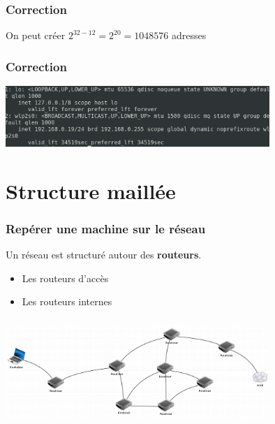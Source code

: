\documentclass[svgnames,11pt]{beamer}
\begin{document}
\begin{frame}
    \frametitle{Correction}

    On peut créer $2^{32-12}=2^{20} = 1048576$ adresses

\end{frame}
\begin{frame}
    \frametitle{Correction}

    \begin{center}
        \centering
        \includegraphics[width=10cm]{ressources/ip.png}
        \label{IMG}
    \end{center}

\end{frame}
\section{Structure maillée}
\begin{frame}
    \frametitle{Repérer une machine sur le réseau}

    Un réseau est structuré autour des \textbf{routeurs}.
\begin{itemize}
    \item<1-> Les routeurs d'accès
    \item<2-> Les routeurs internes
\end{itemize}

\end{frame}

\begin{frame}
    \frametitle{}

    \begin{center}
        \centering
        \includegraphics[width=10cm]{ressources/reseau.png}
        \label{reseau}
    \end{center}

\end{frame}
\end{document}
